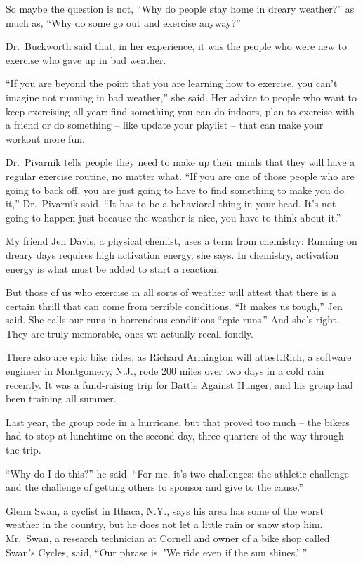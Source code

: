 ﻿\documentclass[12pt]{article}
\begin{document}
So maybe the question is not, ``Why do people stay home in dreary weather?'' as much as, ``Why do
some go out and exercise anyway?''

Dr.~Buckworth said that, in her experience, it was the people who were new to exercise who gave up
in bad weather.

``If you are beyond the point that you are learning how to exercise, you can't imagine not running
in bad weather,'' she said. Her advice to people who want to keep exercising all year: find
something you can do indoors, plan to exercise with a friend or do something -- like update your
playlist -- that can make your workout more fun.

Dr.~Pivarnik tells people they need to make up their minds that they will have a regular exercise
routine, no matter what. ``If you are one of those people who are going to back off, you are just
going to have to find something to make you do it,'' Dr.~Pivarnik said. ``It has to be a behavioral
thing in your head. It's not going to happen just because the weather is nice, you have to think
about it.''

My friend Jen Davis, a physical chemist, uses a term from chemistry: Running on dreary days requires
high activation energy, she says. In chemistry, activation energy is what must be added to start a
reaction.

But those of us who exercise in all sorts of weather will attest that there is a certain thrill that
can come from terrible conditions. ``It makes us tough,'' Jen said. She calls our runs in horrendous
conditions ``epic runs.'' And she's right. They are truly memorable, ones we actually recall fondly.

There also are epic bike rides, as Richard Armington will attest.Rich, a software engineer in
Montgomery, N.J., rode 200 miles over two days in a cold rain recently. It was a fund-raising trip
for Battle Against Hunger, and his group had been training all summer.

Last year, the group rode in a hurricane, but that proved too much -- the bikers had to stop at
lunchtime on the second day, three quarters of the way through the trip.

``Why do I do this?'' he said. ``For me, it's two challenges: the athletic challenge and the
challenge of getting others to sponsor and give to the cause.''

Glenn Swan, a cyclist in Ithaca, N.Y., says his area has some of the worst weather in the country,
but he does not let a little rain or snow stop him. Mr.~Swan, a research technician at Cornell and
owner of a bike shop called Swan's Cycles, said, ``Our phrase is, 'We ride even if the sun shines.'
''
\end{document}

